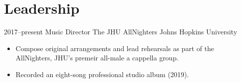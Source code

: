 \section{Leadership}

\cventry
{2017--present}
{Music Director}
{The JHU AllNighters}
{Johns Hopkins University}
{}
{
\begin{itemize}
    \item Compose original arrangements and lead rehearsals as part of the AllNighters, JHU's premeir all-male a cappella group.
    \item Recorded an eight-song professional studio album (2019).
\end{itemize}
}